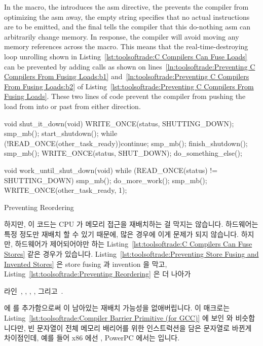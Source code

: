 {{{{In the  macro, the  introduces the asm
directive, the  prevents the compiler from optimizing
the asm away, the empty string specifies that no actual instructions
are to be emitted, and the final  tells the compiler that
this do-nothing asm can arbitrarily change memory.
In response, the compiler will avoid moving any memory references across
the  macro.
This means that the real-time-destroying loop unrolling shown in
Listing~\ref{lst:toolsoftrade:C Compilers Can Fuse Loads}
can be prevented by adding  calls as shown on
lines~\ref{ln:toolsoftrade:Preventing C Compilers From Fusing Loads:b1}
and~\ref{ln:toolsoftrade:Preventing C Compilers From Fusing Loads:b2}
of
Listing~\ref{lst:toolsoftrade:Preventing C Compilers From Fusing Loads}.
These two lines of code prevent the compiler from pushing the load from
 into or past  from either
direction.
\fi

\begin{listing}[tbp]
\begin{linelabel}
\begin{VerbatimL}[commandchars=\\\[\]]
void shut_it_down(void)
{
	WRITE_ONCE(status, SHUTTING_DOWN);
	smp_mb(); \lnlbl[mb1]
	start_shutdown();
	while (!READ_ONCE(other_task_ready))\lnlbl[loop:b]
		continue;
	smp_mb(); \lnlbl[mb2]
	finish_shutdown();
	smp_mb(); \lnlbl[mb3]
	WRITE_ONCE(status, SHUT_DOWN);
	do_something_else();
}

void work_until_shut_down(void)
{
	while (READ_ONCE(status) != SHUTTING_DOWN) {
		smp_mb(); \lnlbl[mb4]
		do_more_work();
	}
	smp_mb(); \lnlbl[mb5]
	WRITE_ONCE(other_task_ready, 1);
}
\end{VerbatimL}
\end{linelabel}
\caption{Preventing Reordering}
\label{lst:toolsoftrade:Preventing Reordering}
\end{listing}

하지만, 이 코드는 CPU 가 메모리 접근을 재배치하는 걸 막지는 않습니다.
하드웨어는 특정 정도만 재배치 할 수 있기 때문에, 많은 경우에 이게 문제가 되지
않습니다.
하지만, 하드웨어가 제어되어야만 하는
Listing~\ref{lst:toolsoftrade:C Compilers Can Fuse Stores} 같은 경우가
있습니다.
Listing~\ref{lst:toolsoftrade:Preventing Store Fusing and Invented Stores}
은 store fusing 과 invention 을 막고,
Listing~\ref{lst:toolsoftrade:Preventing Reordering}
은 더 나아가
\begin{lineref}
라인~, , , ,
그리고~.
\end{lineref}
에  를 추가함으로써 이 남아있는 재배치 가능성을 없애버립니다.
이  매크로는
Listing~\ref{lst:toolsoftrade:Compiler Barrier Primitive (for GCC)}
에 보인  와 비슷합니다만, 빈 문자열이 전체 메모리 배리어를 위한
인스트럭션을 담은 문자열로 바뀐게 차이점인데, 예를 들어 x86 에선 ,
PowerPC 에서는  입니다.
\iffalse

}}}}
